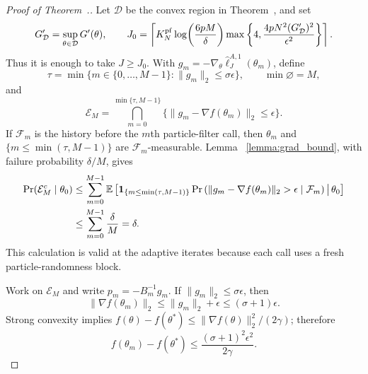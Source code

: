 \begin{proof}[Proof of Theorem~{\thmMopConvergence}.]
Let $\mathcal D$ be the convex region in Theorem~{\thmMopConvergence}, and set
\begin{equation}
G'_{\mathcal D}=\sup_{\theta\in\mathcal D}G'(\theta),\qquad
J_0=\left\lceil
K_N^{\rm pf}\log\!\left(\frac{6pM}{\delta}\right)
\max\left\{4,
\frac{4pN^2(G'_{\mathcal D})^2}{\epsilon^2}
\right\}\right\rceil.                                      \label{eq:s2-theorem-particle-count}
\end{equation}
Thus it is enough to take $J\geq J_0$.  With
$g_m=-\nabla_\theta\hat\ell_J^{A,1}(\theta_m)$, define
\begin{equation}
\tau=\min\big\{m\in\{0,\ldots,M-1\}:\|g_m\|_2\leq\sigma\epsilon\big\},
\qquad \min\varnothing=M,                                  \label{eq:s2-stopping-time}
\end{equation}
and
\begin{equation}
\mathcal E_M=
\bigcap_{m=0}^{\min\{\tau,M-1\}}
\big\{\|g_m-\nabla f(\theta_m)\|_2\leq\epsilon\big\}.    \label{eq:s2-gradient-event}
\end{equation}
If $\mathcal F_m$ is the history before the $m$th particle-filter call, then
$\theta_m$ and
$\{m\leq\min(\tau,M-1)\}$ are $\mathcal F_m$-measurable.  Lemma~
\ref{lemma:grad_bound}, with failure probability $\delta/M$, gives
\begin{equation}
\begin{aligned}
\Pr(\mathcal E_M^c\mid\theta_0)
&\leq\sum_{m=0}^{M-1}
 \mathbb{E}\left[\mathbf1_{\{m\leq\min(\tau,M-1)\}}
 \Pr\left(
 \|g_m-\nabla f(\theta_m)\|_2>\epsilon\mid\mathcal F_m
 \right)\,\middle|\,\theta_0\right]\\
&\leq\sum_{m=0}^{M-1}\frac{\delta}{M}=\delta.
\end{aligned}                                                   \label{eq:s2-all-gradient-events}
\end{equation}
This calculation is valid at the adaptive iterates because each call uses a
fresh particle-randomness block.

Work on $\mathcal E_M$ and write
$p_m=-B_m^{-1}g_m$.  If $\|g_m\|_2\leq\sigma\epsilon$, then
\begin{equation}
\|\nabla f(\theta_m)\|_2
 \leq\|g_m\|_2+\epsilon\leq(\sigma+1)\epsilon.                 \label{eq:s2-stopping-gradient}
\end{equation}
Strong convexity implies
$f(\theta)-f(\theta^*)\leq\|\nabla f(\theta)\|_2^2/(2\gamma)$;
therefore
\begin{equation}
f(\theta_m)-f(\theta^*)
\leq\frac{(\sigma+1)^2\epsilon^2}{2\gamma}.                   \label{eq:s2-stopping-neighborhood}
\end{equation}


\end{proof}
